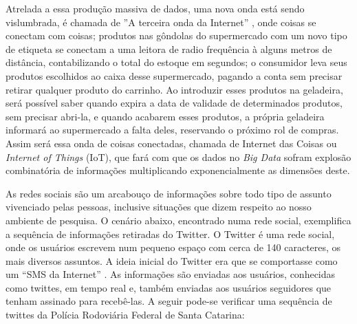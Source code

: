 \documentclass[conference,compsoc]{IEEEtran}
\begin{document}
Atrelada a essa produção massiva de dados, uma nova onda está sendo vislumbrada, é chamada de ''A terceira onda da Internet''
, onde coisas se conectam com coisas; produtos nas gôndolas do supermercado com um novo tipo de etiqueta se conectam a uma 
leitora de radio frequência à alguns metros de distância, contabilizando o total do estoque em segundos; o consumidor leva 
seus produtos escolhidos ao caixa desse supermercado, pagando a conta sem precisar retirar qualquer produto do carrinho. 
Ao introduzir esses produtos na geladeira, será possível saber quando expira a data de validade de determinados produtos, sem 
precisar abri-la, e quando acabarem esses produtos, a própria geladeira informará ao supermercado a falta deles, reservando 
o próximo rol de compras. Assim será essa onda de coisas conectadas, chamada de Internet das Coisas ou \textit{Internet of Things} (IoT),
que fará com que os dados no \textit{Big Data} sofram explosão combinatória de informações multiplicando exponencialmente as dimensões deste.


As redes sociais são um arcabouço de informações sobre todo tipo de assunto vivenciado pelas pessoas, inclusive situações que dizem respeito ao nosso ambiente de pesquisa.
O cenário abaixo, encontrado numa rede social, exemplifica a sequência de informações retiradas do Twitter.
O Twitter é uma rede social, onde os usuários escrevem num pequeno espaço com cerca de 140 caracteres, os mais diversos assuntos. A ideia inicial do Twitter era que se comportasse como um ``SMS da Internet'' \cite{Twitter2015}. As informações são enviadas aos usuários, conhecidas como twittes, em tempo real e, também enviadas aos usuários seguidores que tenham assinado para recebê-las. A seguir pode-se verificar uma sequência de twittes da Polícia Rodoviária Federal de Santa Catarina:
\end{document}
